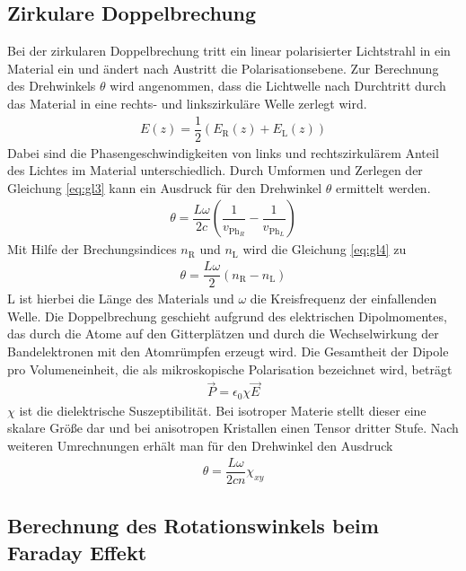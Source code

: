 \subsection{Zirkulare Doppelbrechung}
Bei der zirkularen Doppelbrechung tritt ein linear polarisierter Lichtstrahl in ein Material ein und ändert nach Austritt die Polarisationsebene. Zur Berechnung des Drehwinkels $\theta$ wird angenommen, dass die Lichtwelle nach Durchtritt durch das Material in eine rechts- und linkszirkuläre Welle zerlegt wird. 
\begin{align}
\label{eq:gl3}
E(z)=\dfrac{1}{2}(E_\text{R}(z)+E_\text{L}(z))
\end{align}
Dabei sind die Phasengeschwindigkeiten von links und rechtszirkulärem Anteil des Lichtes im Material unterschiedlich. Durch Umformen und Zerlegen der Gleichung \ref{eq:gl3} kann ein Ausdruck für den Drehwinkel $\theta$ ermittelt werden. 
\begin{align}
\label{eq:gl4}
\theta= \dfrac{L\omega}{2c} \left(\dfrac{1}{v_{\text{Ph}_R}}-\dfrac{1}{v_{\text{Ph}_L}}\right)
\end{align}
Mit Hilfe der Brechungsindices $n_\text{R}$ und $n_\text{L}$ wird die Gleichung \ref{eq:gl4} zu
\begin{align}
\theta= \dfrac{L\omega}{2} (n_\text{R}-n_\text{L})
\end{align}
L ist hierbei die Länge des Materials und $\omega$ die Kreisfrequenz der einfallenden Welle. Die Doppelbrechung geschieht aufgrund des elektrischen Dipolmomentes, das durch die Atome auf den Gitterplätzen und durch die Wechselwirkung der Bandelektronen mit den Atomrümpfen erzeugt wird. Die Gesamtheit der Dipole pro Volumeneinheit, die als mikroskopische Polarisation bezeichnet wird, beträgt
\begin{align}
\vec{P}=\epsilon_0 \chi \vec{E}
\end{align}
$\chi$ ist die dielektrische Suszeptibilität. Bei isotroper Materie stellt dieser eine skalare Größe dar und bei anisotropen Kristallen einen Tensor dritter Stufe. Nach weiteren Umrechnungen erhält man für den Drehwinkel den Ausdruck 
\begin{align}
\theta= \dfrac{L\omega}{2cn}\chi_{xy}
\end{align}
\subsection{Berechnung des Rotationswinkels beim Faraday Effekt}

